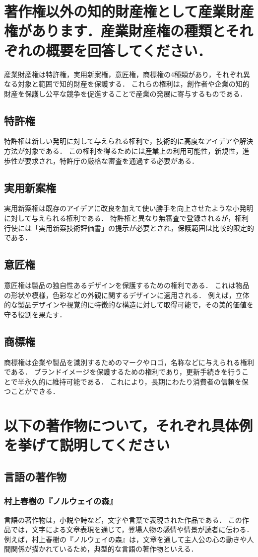 \documentclass[titlepage,a4paper]{jsarticle}
\begin{document}
\section{著作権以外の知的財産権として産業財産権があります．産業財産権の種類とそれぞれの概要を回答してください．}
産業財産権は特許権，実用新案権，意匠権，商標権の4種類があり，それぞれ異なる対象と範囲で知的財産を保護する．
これらの権利は，創作者や企業の知的財産を保護し公平な競争を促進することで産業の発展に寄与するものである．
\subsection{特許権}
特許権は新しい発明に対して与えられる権利で，技術的に高度なアイデアや解決方法が対象である．
この権利を得るためには産業上の利用可能性，新規性，進歩性が要求され，特許庁の厳格な審査を通過する必要がある\cite{5_1}．
\subsection{実用新案権}
実用新案権は既存のアイデアに改良を加えて使い勝手を向上させたような小発明に対して与えられる権利である．
特許権と異なり無審査で登録されるが，権利行使には「実用新案技術評価書」の提示が必要とされ，保護範囲は比較的限定的である\cite{5_2}．
\subsection{意匠権}
意匠権は製品の独自性あるデザインを保護するための権利である．
これは物品の形状や模様，色彩などの外観に関するデザインに適用される．
例えば，立体的な製品デザインや視覚的に特徴的な構造に対して取得可能で，その美的価値を守る役割を果たす\cite{5_3}．
\subsection{商標権}
商標権は企業や製品を識別するためのマークやロゴ，名称などに与えられる権利である．
ブランドイメージを保護するための権利であり，更新手続きを行うことで半永久的に維持可能である．
これにより，長期にわたり消費者の信頼を保つことができる\cite{5_4}．
\section{以下の著作物について，それぞれ具体例を挙げて説明してください}
\subsection{言語の著作物}
\subsubsection*{村上春樹の『ノルウェイの森』}
言語の著作物は，小説や詩など，文字や言葉で表現された作品である．
この作品では，文字による文章表現を通じて，登場人物の感情や情景が読者に伝わる．
例えば，村上春樹の『ノルウェイの森』は，文章を通して主人公の心の動きや人間関係が描かれているため，典型的な言語の著作物といえる．
\end{document}
